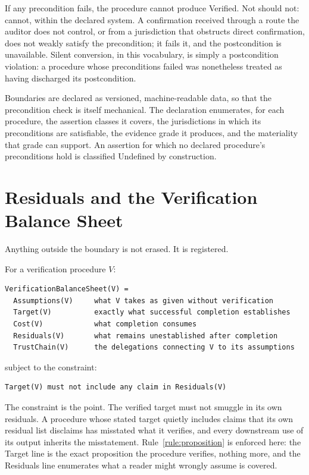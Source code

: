 \documentclass[smallcondensed,envcountsect,natbib]{svjour3}
\newcommand{\state}[1]{\textsf{#1}}
\begin{document}
If any precondition fails, the procedure cannot produce \state{Verified}. Not should not: cannot, within the declared system. A confirmation received through a route the auditor does not control, or from a jurisdiction that obstructs direct confirmation, does not weakly satisfy the precondition; it fails it, and the postcondition is unavailable. Silent conversion, in this vocabulary, is simply a postcondition violation: a procedure whose preconditions failed was nonetheless treated as having discharged its postcondition.

Boundaries are declared as versioned, machine-readable data, so that the precondition check is itself mechanical. The declaration enumerates, for each procedure, the assertion classes it covers, the jurisdictions in which its preconditions are satisfiable, the evidence grade it produces, and the materiality that grade can support. An assertion for which no declared procedure's preconditions hold is classified \state{Undefined} by construction.

\section{Residuals and the Verification Balance Sheet}
\label{sec:residuals}

Anything outside the boundary is not erased. It is registered.

\begin{definition}
\label{def:vbs}
For a verification procedure $V$:
\begin{lstlisting}
VerificationBalanceSheet(V) =
  Assumptions(V)     what V takes as given without verification
  Target(V)          exactly what successful completion establishes
  Cost(V)            what completion consumes
  Residuals(V)       what remains unestablished after completion
  TrustChain(V)      the delegations connecting V to its assumptions
\end{lstlisting}
subject to the constraint:
\begin{lstlisting}
Target(V) must not include any claim in Residuals(V)
\end{lstlisting}
\end{definition}

The constraint is the point. The verified target must not smuggle in its own residuals. A procedure whose stated target quietly includes claims that its own residual list disclaims has misstated what it verifies, and every downstream use of its output inherits the misstatement. Rule~\ref{rule:proposition} is enforced here: the Target line is the exact proposition the procedure verifies, nothing more, and the Residuals line enumerates what a reader might wrongly assume is covered.
\end{document}
